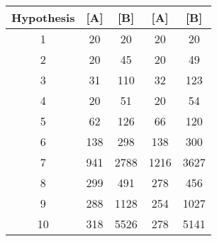 \begin{tabular}{c|cccc}
Hypothesis & [A] & [B] & [A] & [B] \\
\hline
1 & 20 & 20 & 20 & 20 \\
2 & 20 & 45 & 20 & 49 \\
3 & 31 & 110 & 32 & 123 \\
4 & 20 & 51 & 20 & 54 \\
5 & 62 & 126 & 66 & 120 \\
6 & 138 & 298 & 138 & 300 \\
7 & 941 & 2788 & 1216 & 3627 \\
8 & 299 & 491 & 278 & 456 \\
9 & 288 & 1128 & 254 & 1027 \\
10 & 318 & 5526 & 278 & 5141 \\
\end{tabular}